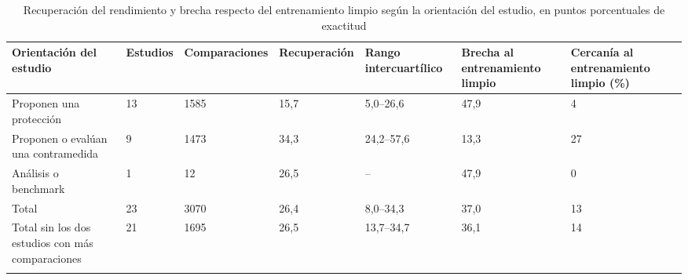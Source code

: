 \begin{table}[t]
\caption{Recuperación del rendimiento y brecha respecto del entrenamiento limpio según la orientación del estudio, en puntos porcentuales de exactitud}\label{tab:orientacion}
\footnotesize
\begin{tabularx}{\textwidth}{@{}L{3.0cm}*{6}{Z{1.0}}@{}}
\toprule
Orientación del estudio & Estudios & Comparaciones & Recuperación & Rango intercuartílico & Brecha al entrenamiento limpio & Cercanía al entrenamiento limpio (\%) \\
\midrule
Proponen una protección & 13 & 1585 & 15,7 & 5,0--26,6 & 47,9 & 4 \\
Proponen o evalúan una contramedida & 9 & 1473 & 34,3 & 24,2--57,6 & 13,3 & 27 \\
Análisis o benchmark & 1 & 12 & 26,5 & -- & 47,9 & 0 \\
\midrule
Total & 23 & 3070 & 26,4 & 8,0--34,3 & 37,0 & 13 \\
Total sin los dos estudios con más comparaciones \cite{S0047,S0105} & 21 & 1695 & 26,5 & 13,7--34,7 & 36,1 & 14 \\
\botrule
\end{tabularx}
\end{table}
